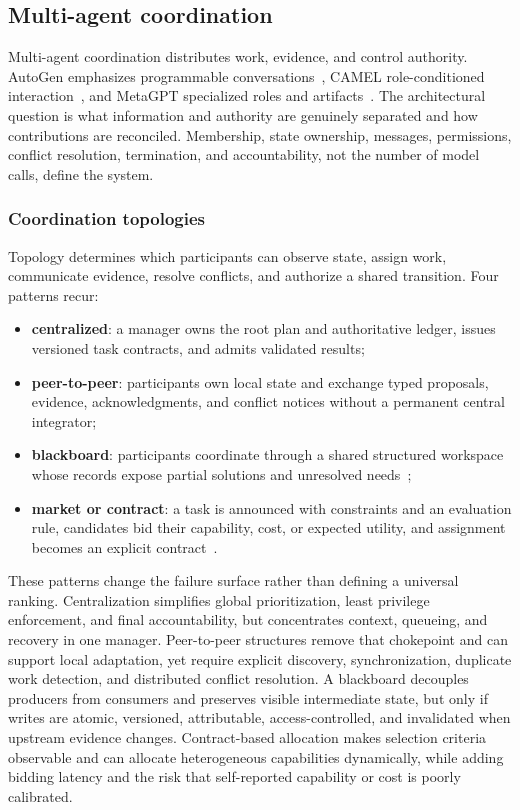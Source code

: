 \subsection{Multi-agent coordination}
\label{sec:multiagent}

Multi-agent coordination distributes work, evidence, and control authority. AutoGen emphasizes programmable conversations~\cite{wu2023autogen}, CAMEL role-conditioned interaction~\cite{li2023camel}, and MetaGPT specialized roles and artifacts~\cite{hong2024metagpt}. The architectural question is what information and authority are genuinely separated and how contributions are reconciled. Membership, state ownership, messages, permissions, conflict resolution, termination, and accountability, not the number of model calls, define the system.

\subsubsection{Coordination topologies}

Topology determines which participants can observe state, assign work, communicate evidence, resolve conflicts, and authorize a shared transition. Four patterns recur:
\begin{itemize}
    \item \textbf{centralized}: a manager owns the root plan and authoritative ledger, issues versioned task contracts, and admits validated results;
    \item \textbf{peer-to-peer}: participants own local state and exchange typed proposals, evidence, acknowledgments, and conflict notices without a permanent central integrator;
    \item \textbf{blackboard}: participants coordinate through a shared structured workspace whose records expose partial solutions and unresolved needs~\cite{nii1986blackboard};
    \item \textbf{market or contract}: a task is announced with constraints and an evaluation rule, candidates bid their capability, cost, or expected utility, and assignment becomes an explicit contract~\cite{smith1980contractnet}.
\end{itemize}

These patterns change the failure surface rather than defining a universal ranking. Centralization simplifies global prioritization, least privilege enforcement, and final accountability, but concentrates context, queueing, and recovery in one manager. Peer-to-peer structures remove that chokepoint and can support local adaptation, yet require explicit discovery, synchronization, duplicate work detection, and distributed conflict resolution. A blackboard decouples producers from consumers and preserves visible intermediate state, but only if writes are atomic, versioned, attributable, access-controlled, and invalidated when upstream evidence changes. Contract-based allocation makes selection criteria observable and can allocate heterogeneous capabilities dynamically, while adding bidding latency and the risk that self-reported capability or cost is poorly calibrated.

